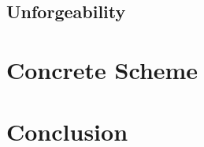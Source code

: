 \documentclass[usenames,dvipsnames]{beamer}
\begin{document}
  \subsection{Unforgeability}
  

\section{Concrete Scheme}








\section{Conclusion}

\end{document}
